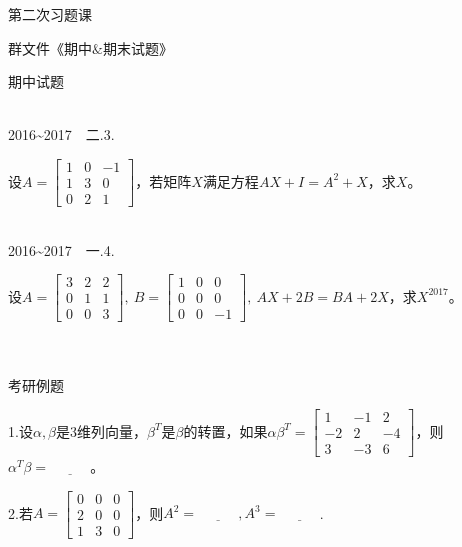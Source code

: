 \documentclass{article}
\begin{document}
 \renewcommand{\thenum}{\arabic{num}.} \newcommand{\num}{\refstepcounter{num}\text{\thenum}}

\hphantom{~~}\hfill {\heiti 第二次习题课} \hfill\hphantom{~~}

\hphantom{~~}\hfill {\heiti 群文件《期中$\&$期末试题》} \hfill\hphantom{~~}


{\heiti {} 期中试题}

{\heiti {} ~}\\

2016\~{}2017~~二.3.

设$
A=
\begin{bmatrix}
  1& 0 &-1 \\
  1&3&0\\
  0&2&1
\end{bmatrix}
$，若矩阵$X$满足方程$AX+I=A^{2}+X$，求$X$。

{\heiti {} ~}\\

2016\~{}2017~~一.4.

设$
A=
\begin{bmatrix}
  3&2&2 \\
  0&1&1\\
  0&0&3
\end{bmatrix}
,~B=
\begin{bmatrix}
  1&0&0 \\
  0&0&0\\
  0&0&-1
\end{bmatrix}
,~AX+2B=BA+2X$，求$X^{2017}$。

{\heiti {} ~}\\
{\heiti {} ~}\\

{\heiti {} 考研例题}

  1.设$\alpha,\beta$是3维列向量，$\beta^{T}$是$\beta$的转置，如果$
  \alpha\beta^{T}=
  \begin{bmatrix}
    1 & -1 & 2 \\
    -2 & 2& -4\\
    3 & -3 & 6
  \end{bmatrix}
  $，则$\alpha^{T}\beta=\underline{~~~~~~~~~~~~~}$。

  2.若$
  A=
  \begin{bmatrix}
   0&0&0\\
   2&0&0\\
   1&3&0
  \end{bmatrix}
  $，则$A^{2}=\underline{~~~~~~~~~~~~~},A^{3}=\underline{~~~~~~~~~~~~~}$.
\end{document}

